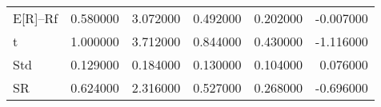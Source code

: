 \begin{tabular}{lrrrrr}
\toprule
\midrule
E[R]--Rf & 0.580000 & 3.072000 & 0.492000 & 0.202000 & -0.007000 \\
t & 1.000000 & 3.712000 & 0.844000 & 0.430000 & -1.116000 \\
Std & 0.129000 & 0.184000 & 0.130000 & 0.104000 & 0.076000 \\
SR & 0.624000 & 2.316000 & 0.527000 & 0.268000 & -0.696000 \\
\bottomrule
\end{tabular}
